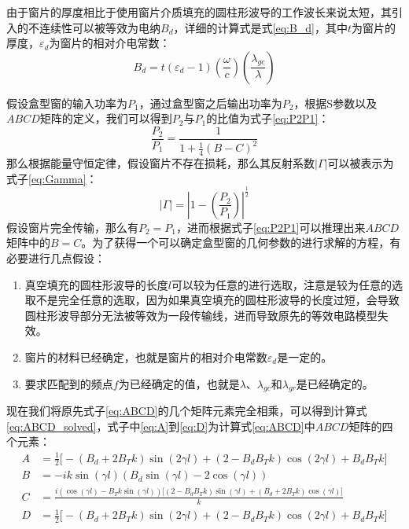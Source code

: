 \documentclass[master]{thesis-uestc}
\begin{document}
由于窗片的厚度相比于使用窗片介质填充的圆柱形波导的工作波长来说太短，其引入的不连续性可以被等效为电纳$B_{d}$，详细的计算式是式\ref{eq:B_d}，其中$t$为窗片的厚度，$\varepsilon_d$为窗片的相对介电常数：
\begin{equation}\label{eq:B_d}
    B_{d} = t (\varepsilon_d - 1) \left( \frac{\omega}{c} \right) \left( \frac{\lambda_{gc}}{\lambda} \right)
\end{equation}

假设盒型窗的输入功率为$P_{1}$，通过盒型窗之后输出功率为$P_{2}$，根据S参数以及$ABCD$矩阵的定义，我们可以得到$P_{2}$与$P_{1}$的比值为式子\ref{eq:P2P1}：
\begin{equation}\label{eq:P2P1}
    \frac{P_{2}}{P_{1}} = \frac{1}{1+\frac{1}{4} (B-C)^2}
\end{equation}
那么根据能量守恒定律，假设窗片不存在损耗，那么其反射系数$|\Gamma|$可以被表示为式子\ref{eq:Gamma}：
\begin{equation}\label{eq:Gamma}
    |\Gamma| = \left| 1 - \left( \frac{P_{2}}{P_{1}} \right) \right|^{\frac{1}{2}}
\end{equation}
假设窗片完全传输，那么有$P_{2}=P_{1}$，进而根据式子\ref{eq:P2P1}可以推理出来$ABCD$矩阵中的$B=C$。为了获得一个可以确定盒型窗的几何参数的进行求解的方程，有必要进行几点假设：
\begin{enumerate}
    \item 真空填充的圆柱形波导的长度$l$可以较为任意的进行选取，注意是较为任意的选取不是完全任意的选取，因为如果真空填充的圆柱形波导的长度过短，会导致圆柱形波导部分无法被等效为一段传输线，进而导致原先的等效电路模型失效。
    \item 窗片的材料已经确定，也就是窗片的相对介电常数$\varepsilon_{d}$是一定的。
    \item 要求匹配到的频点$f$为已经确定的值，也就是$\lambda$、$\lambda_{gc}$和$\lambda_{gr}$是已经确定的。
\end{enumerate}


现在我们将原先式子\ref{eq:ABCD}的几个矩阵元素完全相乘，可以得到计算式\ref{eq:ABCD_solved}，式子中\ref{eq:A}到\ref{eq:D}为计算式\ref{eq:ABCD}中$ABCD$矩阵的四个元素：
\begin{subequations}\label{eq:ABCD_solved}
    \begin{align}
        A &= \frac{1}{2} \big[-(B_d + 2 B_T k) \sin(2\gamma l) + (2 - B_d B_T k)\cos(2\gamma l) + B_d B_T k \big] \label{eq:A} \\
        B &= -i k \sin(\gamma l) (B_d \sin(\gamma l) - 2 \cos(\gamma l)) \label{eq:B} \\
        C &= \frac{i (\cos(\gamma l) - B_T k \sin(\gamma l)) \big[(2 - B_d B_T k)\sin(\gamma l) + (B_d + 2 B_T k)\cos(\gamma l)\big]}{k} \label{eq:C} \\
        D &= \frac{1}{2} \big[-(B_d + 2 B_T k) \sin(2\gamma l) + (2 - B_d B_T k)\cos(2\gamma l) + B_d B_T k \big] \label{eq:D}
    \end{align}
\end{subequations}
\end{document}
